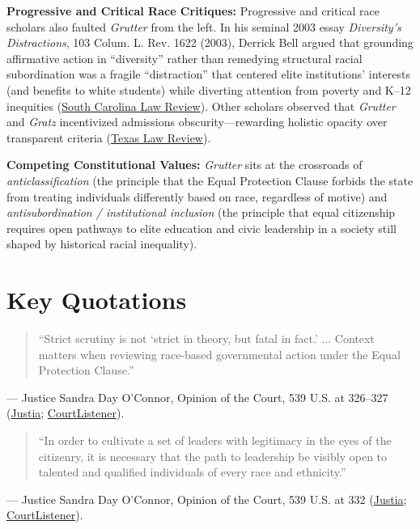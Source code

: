 \documentclass[12pt]{article}
\begin{document}
\textbf{Progressive and Critical Race Critiques:} Progressive and critical race scholars also faulted \textit{Grutter} from the left. In his seminal 2003 essay \textit{Diversity's Distractions}, 103 Colum. L. Rev. 1622 (2003), Derrick Bell argued that grounding affirmative action in ``diversity'' rather than remedying structural racial subordination was a fragile ``distraction'' that centered elite institutions' interests (and benefits to white students) while diverting attention from poverty and K--12 inequities (\href{https://sclawreview.org/article/diversitys-distractions-revisited-the-case-of-latinx-in-higher-education/}{South Carolina Law Review}). Other scholars observed that \textit{Grutter} and \textit{Gratz} incentivized admissions obscurity---rewarding holistic opacity over transparent criteria (\href{https://texaslawreview.org/the-goose-and-the-gander-how-conservative-precedents-will-save-campus-affirmative-action/}{Texas Law Review}).

\textbf{Competing Constitutional Values:} \textit{Grutter} sits at the crossroads of \textit{anticlassification} (the principle that the Equal Protection Clause forbids the state from treating individuals differently based on race, regardless of motive) and \textit{antisubordination / institutional inclusion} (the principle that equal citizenship requires open pathways to elite education and civic leadership in a society still shaped by historical racial inequality).

\section{Key Quotations}
\begin{quote}
``Strict scrutiny is not `strict in theory, but fatal in fact.' ... Context matters when reviewing race-based governmental action under the Equal Protection Clause.''
\end{quote}
\noindent --- Justice Sandra Day O'Connor, Opinion of the Court, 539 U.S. at 326--327 (\href{https://supreme.justia.com/cases/federal/us/539/306/}{Justia}; \href{https://www.courtlistener.com/opinion/130155/grutter-v-bollinger/}{CourtListener}).

\begin{quote}
``In order to cultivate a set of leaders with legitimacy in the eyes of the citizenry, it is necessary that the path to leadership be visibly open to talented and qualified individuals of every race and ethnicity.''
\end{quote}
\noindent --- Justice Sandra Day O'Connor, Opinion of the Court, 539 U.S. at 332 (\href{https://supreme.justia.com/cases/federal/us/539/306/}{Justia}; \href{https://www.courtlistener.com/opinion/130155/grutter-v-bollinger/}{CourtListener}).
\end{document}
